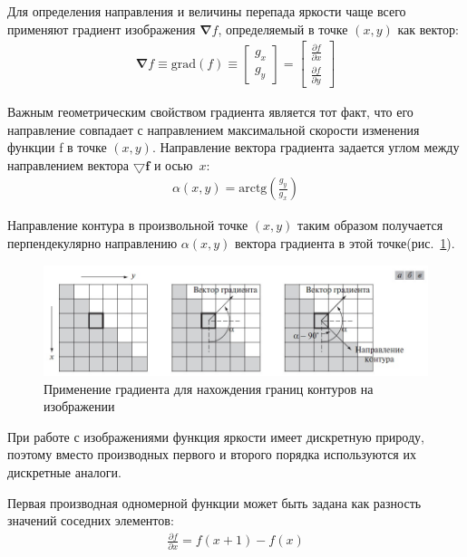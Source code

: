 \documentclass[12pt]{article} %
\begin{document}
Для определения направления и величины перепада яркости чаще всего применяют градиент изображения $\boldsymbol{\nabla}f$, определяемый в точке $(x,y)$ как вектор:
\begin{gather}\label{grad}
	\boldsymbol{\nabla}{f} \equiv \text{grad}(f)\equiv
	\begin{bmatrix} g_x \\ g_y \end{bmatrix}=
	\begin{bmatrix} \frac{\partial f}{\partial x} \\ \frac{\partial f}{\partial y}
	\end{bmatrix}
\end{gather}

Важным геометрическим свойством градиента является тот факт, что его направление совпадает с направлением максимальной скорости изменения функции f в точке $(x, y)$. Направление вектора градиента задается углом между направлением вектора $\bigtriangledown \mathbf{f}$ и осью~$x$:
\begin{gather}\label{grad_alpha}
	\alpha(x, y) = \text{arctg}\left(\frac{g_y}{g_x}\right)
\end{gather}

Направление контура в произвольной точке $(x,y)$ таким образом получается перпендекулярно направлению $\alpha(x,y)$ вектора градиента в этой точке(рис.~\ref{fig:grad}).


\begin{figure}[h]
	
	\centering
	
	\includegraphics[width=0.7\linewidth]{grad.jpg}
	
	\caption{Применение градиента для нахождения границ контуров на изображении}
	
	\label{fig:grad}
	
\end{figure}

\newpage

При работе с изображениями функция яркости имеет дискретную природу, поэтому вместо производных первого и второго порядка используются их дискретные аналоги.

Первая производная одномерной функции может быть задана как разность значений соседних элементов:
\begin{gather}\label{first}
	\frac{\partial f}{\partial x}=
	f(x+1) - f(x)
\end{gather}
\end{document}
